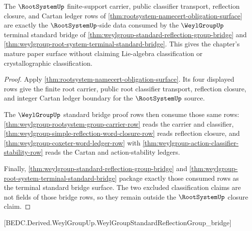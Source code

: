 \begin{theorem}
\label{thm:rootsystem-mature-bridge-consumption}
The $\RootSystemUp$ finite-support carrier, public classifier transport,
reflection closure, and Cartan ledger rows of
\autoref{thm:rootsystem-namecert-obligation-surface} are exactly the
$\RootSystemUp$-side data consumed by the $\WeylGroupUp$ terminal standard
bridge of \autoref{thm:weylgroup-standard-reflection-group-bridge} and
\autoref{thm:weylgroup-root-system-terminal-standard-bridge}. This gives the
chapter's mature paper surface without claiming Lie-algebra classification or
crystallographic classification.
\end{theorem}
\begin{proof}
Apply \autoref{thm:rootsystem-namecert-obligation-surface}. Its four displayed
rows give the finite root carrier, public root classifier transport, reflection
closure, and integer Cartan ledger boundary for the $\RootSystemUp$ source.

The $\WeylGroupUp$ standard bridge proof rows then consume those same rows:
\autoref{thm:weylgroup-rootsystem-group-carrier-row} reads the carrier and
classifier, \autoref{thm:weylgroup-simple-reflection-word-closure-row} reads
reflection closure, and \autoref{thm:weylgroup-coxeter-word-ledger-row} with
\autoref{thm:weylgroup-action-classifier-stability-row} reads the Cartan and
action-stability ledgers.

Finally, \autoref{thm:weylgroup-standard-reflection-group-bridge} and
\autoref{thm:weylgroup-root-system-terminal-standard-bridge} package exactly
those consumed rows as the terminal standard bridge surface. The two excluded
classification claims are not fields of those bridge rows, so they remain
outside the $\RootSystemUp$ closure claim.
\end{proof}

[BEDC.Derived.WeylGroupUp.WeylGroupStandardReflectionGroup\_bridge]

